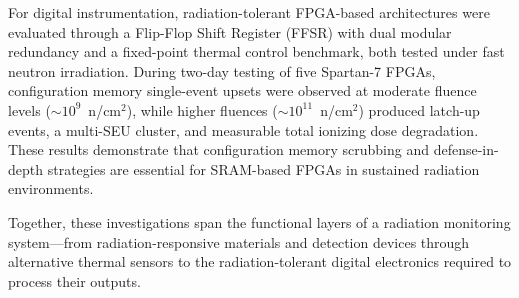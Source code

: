 For digital instrumentation, radiation-tolerant FPGA-based architectures were evaluated through a Flip-Flop Shift Register (FFSR) with dual modular redundancy and a fixed-point thermal control benchmark, both tested under fast neutron irradiation. During two-day testing of five Spartan-7 FPGAs, configuration memory single-event upsets were observed at moderate fluence levels ($\sim$$10^9$~n/cm$^2$), while higher fluences ($\sim$$10^{11}$~n/cm$^2$) produced latch-up events, a multi-SEU cluster, and measurable total ionizing dose degradation. These results demonstrate that configuration memory scrubbing and defense-in-depth strategies are essential for SRAM-based FPGAs in sustained radiation environments.

Together, these investigations span the functional layers of a radiation monitoring system---from radiation-responsive materials and detection devices through alternative thermal sensors to the radiation-tolerant digital electronics required to process their outputs.
